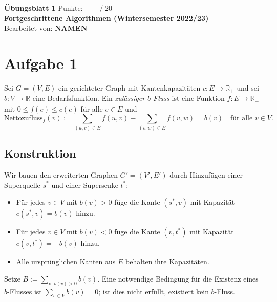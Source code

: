 \documentclass[a4paper]{scrartcl}
\def\to{\ensuremath{\rightarrow}} %
\def\sheetNumber{1}
\def\names{NAMEN}
\def\sumPoints{20}
\begin{document}
\begin{doublespace} %
\noindent \textbf{\LARGE{Übungsblatt \sheetNumber}}
\hfill  {\large Punkte: $\boxed{\qquad  /\; \sumPoints}$}\\
{\Large \textbf{Fortgeschrittene Algorithmen (Wintersemester 2022/23)}\\
Bearbeitet von: \textbf{\names}}
\end{doublespace}

\section*{Aufgabe 1}

Sei $G=(V,E)$ ein gerichteter Graph mit Kantenkapazitäten $c:E\to\mathbb{R}_{+}$ und sei
$b:V\to\mathbb{R}$ eine Bedarfsfunktion. Ein \emph{zulässiger $b$-Fluss} ist eine Funktion $f:E\to\mathbb{R}_{+}$ mit
$0\le f(e)\le c(e)$ für alle $e\in E$ und
\[\text{Nettozufluss}_f(v):=\sum_{(u,v)\in E} f(u,v)-\sum_{(v,w)\in E} f(v,w)=b(v)\quad\text{für alle }v\in V.
\]

\subsection*{Konstruktion}
Wir bauen den erweiterten Graphen $G'=(V',E')$ durch Hinzufügen einer Superquelle $s^*$ und einer Supersenke $t^*$:
\begin{itemize}
  \item Für jedes $v\in V$ mit $b(v)>0$ füge die Kante $(s^*,v)$ mit Kapazität $c(s^*,v)=b(v)$ hinzu.
  \item Für jedes $v\in V$ mit $b(v)<0$ füge die Kante $(v,t^*)$ mit Kapazität $c(v,t^*)=-b(v)$ hinzu.
  \item Alle ursprünglichen Kanten aus $E$ behalten ihre Kapazitäten.
\end{itemize}
Setze $B:=\sum_{v:\,b(v)>0} b(v)$. Eine notwendige Bedingung für die Existenz eines $b$-Flusses ist $\sum_{v\in V} b(v)=0$;
ist dies nicht erfüllt, existiert kein $b$-Fluss.
\end{document}
